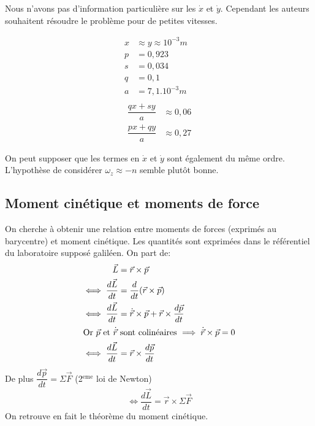 \documentclass[12pt,a4paper]{article}
\begin{document}
	
	Nous n'avons pas d'information particulière sur les $\dot{x}$ et $\dot{y}$. Cependant les auteurs souhaitent résoudre le problème pour de petites vitesses.
	
	\begin{multicols}{2}
		\noindent
		\begin{align*}
		x&\approx y \approx 10^{-3}m&\\
		p&=0,923&\\
		s&=0,034&\\
		q&=0,1&\\
		a&=7,1.10^{-3}m&\\
		\end{align*}
		\columnbreak
		\begin{align*}
		\dfrac{qx+sy}{a}&\approx0,06\\[2em]
		\dfrac{px+qy}{a}&\approx0,27
		\end{align*}
	\end{multicols}
	\vspace*{-3em}
	On peut supposer que les termes en $\dot{x}$ et $\dot{y}$ sont également du même ordre.\\
	L'hypothèse de considérer $\omega_z\approx-n$ semble plutôt bonne.
	
	
	
	\subsection{Moment cinétique et moments de force}
	\label{subsec:moments}
	On cherche à obtenir une relation entre moments de forces (exprimés au barycentre) et moment cinétique. Les quantités sont exprimées dans le référentiel du laboratoire supposé galiléen.
	On part de:
	\begin{align*}
	\vec{L}     &= \vec{r}\times \vec{p}\\
	\iff\dfrac{d\vec{L}}{dt} &= \dfrac{d}{dt}(\vec{r}\times \vec{p})\\
	\iff\dfrac{d\vec{L}}{dt} &= \dot{\vec{r}}\times \vec{p}+\vec{r}\times \dfrac{d\vec{p}}{dt}\\
	\intertext{Or $\vec{p}$ et $\dot{\vec{r}}$ sont colinéaires $\implies \dot{\vec{r}}\times \vec{p} = 0$}
	\iff\dfrac{d\vec{L}}{dt} &= \vec{r}\times \dfrac{d\vec{p}}{dt}
	\end{align*}
	De plus $\dfrac{d\vec{p}}{dt}=\Sigma\vec{F}$ (2$^{\mathrm{eme}}$ loi de Newton)
	\begin{equation}
	\iff\dfrac{d\vec{L}}{dt} = \vec{r}\times\Sigma\vec{F}
	\end{equation}
	On retrouve en fait le théorème du moment cinétique.
\end{document}
